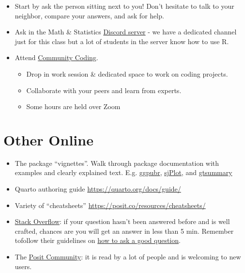 \documentclass[
  letterpaper,
  DIV=11,
  numbers=noendperiod,
  oneside]{scrreprt}
\providecommand{\tightlist}{%
  \setlength{\itemsep}{0pt}\setlength{\parskip}{0pt}}\usepackage{longtable,booktabs,array}
\begin{document}
\begin{itemize}
\tightlist
\item
  Start by ask the person sitting next to you! Don't hesitate to talk to
  your neighbor, compare your answers, and ask for help.
\item
  Ask in the Math \& Statistics
  \href{https://discord.gg/ck497bJty5}{Discord server} - we have a
  dedicated channel just for this class but a lot of students in the
  server know how to use R.
\item
  Attend
  \href{https://datascience.csuchico.edu/communitycoding}{Community
  Coding}.

  \begin{itemize}
  \tightlist
  \item
    Drop in work session \& dedicated space to work on coding projects.
  \item
    Collaborate with your peers and learn from experts.
  \item
    Some hours are held over Zoom
  \end{itemize}
\end{itemize}

\section*{Other Online}\label{other-online}


\begin{itemize}
\tightlist
\item
  The package ``vignettes''. Walk through package documentation with
  examples and clearly explained text. E.g.
  \href{https://rpkgs.datanovia.com/ggpubr/index.html}{ggpubr},
  \href{https://strengejacke.github.io/sjPlot/index.html}{sjPlot}, and
  \href{https://www.danieldsjoberg.com/gtsummary/}{gtsummary}
\item
  Quarto authoring guide \url{https://quarto.org/docs/guide/}
\item
  Variety of ``cheatsheets''
  \url{https://posit.co/resources/cheatsheets/}
\item
  \href{http://stackoverflow.com/questions/tagged/r}{Stack Overflow}: if
  your question hasn't been answered before and is well crafted, chances
  are you will get an answer in less than 5 min. Remember tofollow their
  guidelines on \href{http://stackoverflow.com/help/how-to-ask}{how to
  ask a good question}.
\item
  The \href{https://forum.posit.co/}{Posit Community}: it is read by a
  lot of people and is welcoming to new users.
\end{itemize}
\end{document}
